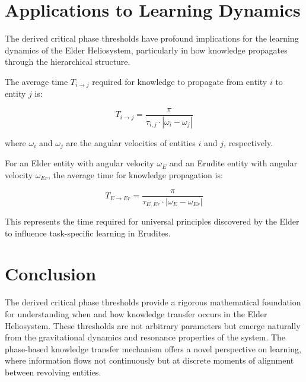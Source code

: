\section{Applications to Learning Dynamics}

The derived critical phase thresholds have profound implications for the learning dynamics of the Elder Heliosystem, particularly in how knowledge propagates through the hierarchical structure.

\begin{theorem}
The average time $T_{i \to j}$ required for knowledge to propagate from entity $i$ to entity $j$ is:

\begin{equation}
T_{i \to j} = \frac{\pi}{\tau_{i,j} \cdot |\omega_i - \omega_j|}
\end{equation}

where $\omega_i$ and $\omega_j$ are the angular velocities of entities $i$ and $j$, respectively.
\end{theorem}

\begin{corollary}
For an Elder entity with angular velocity $\omega_E$ and an Erudite entity with angular velocity $\omega_{Er}$, the average time for knowledge propagation is:

\begin{equation}
T_{E \to Er} = \frac{\pi}{\tau_{E,Er} \cdot |\omega_E - \omega_{Er}|}
\end{equation}

This represents the time required for universal principles discovered by the Elder to influence task-specific learning in Erudites.
\end{corollary}

\section{Conclusion}

The derived critical phase thresholds provide a rigorous mathematical foundation for understanding when and how knowledge transfer occurs in the Elder Heliosystem. These thresholds are not arbitrary parameters but emerge naturally from the gravitational dynamics and resonance properties of the system. The phase-based knowledge transfer mechanism offers a novel perspective on learning, where information flows not continuously but at discrete moments of alignment between revolving entities.